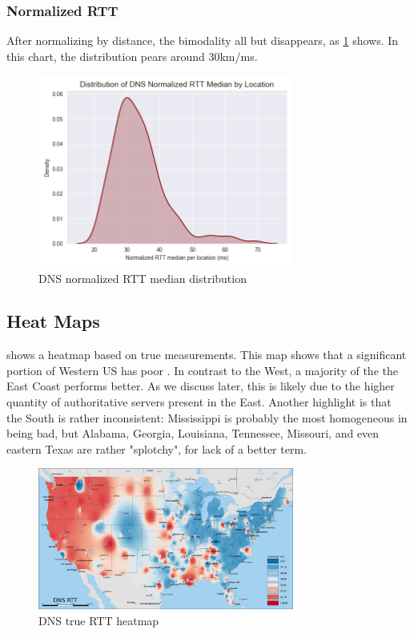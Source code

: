 \subsubsection{Normalized RTT}

After normalizing by distance, the bimodality all but disappears, as \cref{fig:dns_analytics_norm_median_dist} shows. In this chart, the distribution pears around 30km/ms.

\begin{figure}[htb]
    \centering
    \includegraphics[width=0.75\textwidth]{images/dns/dist_raw_data/dns_norm_rtt_median_distribution.png}
    \caption{DNS normalized RTT median distribution}
    \label{fig:dns_analytics_norm_median_dist}
\end{figure}

\subsection{Heat Maps}

 shows a heatmap based on true \dns \rtt measurements. This map shows that a significant portion of Western US has poor \dns \rtts. In contrast to the West, a majority of the the East Coast performs better. As we discuss later, this is likely due to the higher quantity of authoritative servers present in the East. Another highlight is that the South is rather inconsistent: Mississippi is probably the most homogeneous in being bad, but Alabama, Georgia, Louisiana, Tennessee, Missouri, and even eastern Texas are rather "splotchy", for lack of a better term.

\begin{figure}[htb]
    \centering
    \includegraphics[width=0.75\textwidth]{images/dns/heatmaps/dns_rtt_idw.png}
    \caption{DNS true RTT heatmap}
    \label{fig:dns_true_rtt_heatmap}
\end{figure}

